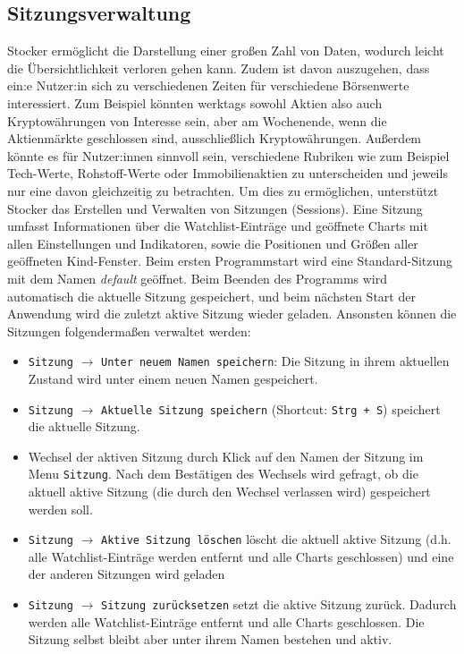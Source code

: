 \documentclass[fontsize=12pt, paper=a4, pagesize=auto, twoside=false, DIV=11, draft=false]{scrartcl}
\begin{document}
\subsection{Sitzungsverwaltung}
Stocker ermöglicht die Darstellung einer großen Zahl von Daten, wodurch leicht die Übersichtlichkeit verloren gehen kann. Zudem ist davon auszugehen, dass ein:e Nutzer:in sich zu verschiedenen Zeiten für verschiedene Börsenwerte interessiert. Zum Beispiel könnten werktags sowohl Aktien also auch Kryptowährungen von Interesse sein, aber am Wochenende, wenn die Aktienmärkte geschlossen sind, ausschließlich Kryptowährungen. Außerdem könnte es für Nutzer:innen sinnvoll sein, verschiedene Rubriken wie zum Beispiel Tech-Werte, Rohstoff-Werte oder Immobilienaktien zu unterscheiden und jeweils nur eine davon gleichzeitig zu betrachten. Um dies zu ermöglichen, unterstützt Stocker das Erstellen und Verwalten von Sitzungen (Sessions). Eine Sitzung umfasst Informationen über die Watchlist-Einträge und geöffnete Charts mit allen Einstellungen und Indikatoren, sowie die Positionen und Größen aller geöffneten Kind-Fenster. Beim ersten Programmstart wird eine Standard-Sitzung mit dem Namen \textit{default} geöffnet. Beim Beenden des Programms wird automatisch die aktuelle Sitzung gespeichert, und beim nächsten Start der Anwendung wird die zuletzt aktive Sitzung wieder geladen. Ansonsten können die Sitzungen folgendermaßen verwaltet werden: 
\begin{itemize}
\item \texttt{Sitzung} $\rightarrow$ \texttt{Unter neuem Namen speichern}: Die Sitzung in ihrem aktuellen Zustand wird unter einem neuen Namen gespeichert. 
\item \texttt{Sitzung} $\rightarrow$ \texttt{Aktuelle Sitzung speichern} (Shortcut: \texttt{Strg + S}) speichert die aktuelle Sitzung.
\item Wechsel der aktiven Sitzung durch Klick auf den Namen der Sitzung im Menu \texttt{Sitzung}. Nach dem Bestätigen des Wechsels wird gefragt, ob die aktuell aktive Sitzung (die durch den Wechsel verlassen wird) gespeichert werden soll.
\item \texttt{Sitzung} $\rightarrow$ \texttt{Aktive Sitzung löschen} löscht die aktuell aktive Sitzung (d.h. alle Watchlist-Einträge werden entfernt und alle Charts geschlossen) und eine der anderen Sitzungen wird geladen
\item \texttt{Sitzung} $\rightarrow$ \texttt{Sitzung zurücksetzen} setzt die aktive Sitzung zurück. Dadurch werden alle Watchlist-Einträge entfernt und alle Charts geschlossen. Die Sitzung selbst bleibt aber unter ihrem Namen bestehen und aktiv.
\end{itemize}
\end{document}

